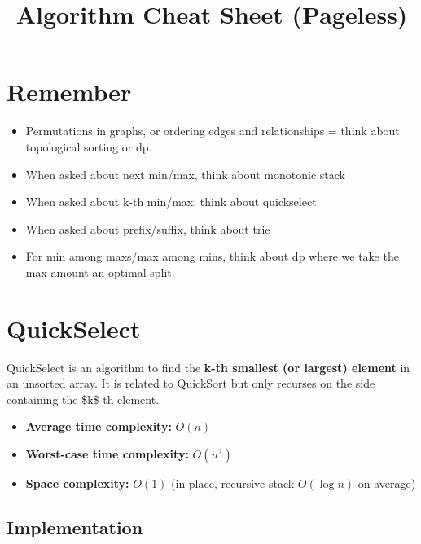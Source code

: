 \documentclass[12pt]{article}
\begin{document}
\title{Algorithm Cheat Sheet (Pageless)}
\author{}
\date{}
\maketitle

\tableofcontents
\vspace{2em}

\section{Remember}
\begin{itemize}
    \item Permutations in graphs, or ordering edges and relationships = think about topological sorting or dp.
    \item When asked about next min/max, think about monotonic stack
    \item When asked about k-th min/max, think about quickselect
    \item When asked about prefix/suffix, think about trie
    \item For min among maxs/max among mins, think about dp where we take the max amount an optimal split.
\end{itemize}

\section{QuickSelect}

QuickSelect is an algorithm to find the \textbf{k-th smallest (or largest) element} in an unsorted array.  
It is related to QuickSort but only recurses on the side containing the \$k\$-th element.

\begin{itemize}
    \item \textbf{Average time complexity:} $O(n)$
    \item \textbf{Worst-case time complexity:} $O(n^2)$
    \item \textbf{Space complexity:} $O(1)$ (in-place, recursive stack $O(\log n)$ on average)
\end{itemize}

\subsection{Implementation}
\end{document}
